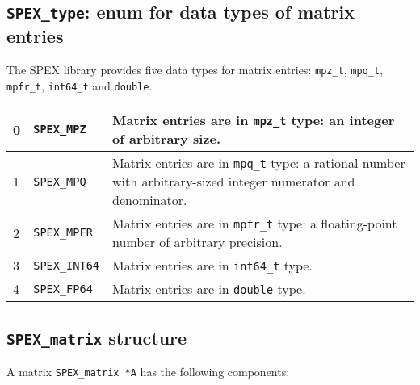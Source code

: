 \documentclass[12pt]{report}
\theoremstyle{definition}
\begin{document}
\cprotect\subsection{\verb|SPEX_type|: enum for data types of matrix entries}
\label{ss:SPEX_type}

The SPEX library provides five data types for matrix entries: \verb|mpz_t|,
\verb|mpq_t|, \verb|mpfr_t|, \verb|int64_t| and \verb|double|.

{\small
\begin{center}
\begin{tabular}{llp{4in}}
\hline
0 & \verb|SPEX_MPZ|     & Matrix entries are in \verb|mpz_t| type: an integer
                          of arbitrary size. \\
\hline
1 & \verb|SPEX_MPQ|     & Matrix entries are in \verb|mpq_t| type: a rational
                          number with arbitrary-sized integer numerator and
                          denominator. \\
\hline
2 & \verb|SPEX_MPFR|    & Matrix entries are in \verb|mpfr_t| type: a
                          floating-point number of arbitrary precision. \\
\hline
3 & \verb|SPEX_INT64|   & Matrix entries are in \verb|int64_t| type. \\
\hline
4 & \verb|SPEX_FP64|    & Matrix entries are in \verb|double| type. \\
\hline
\end{tabular}
\label{tab:SPEX_type}
\end{center}
}

\cprotect\subsection{\verb|SPEX_matrix| structure}

A matrix \verb|SPEX_matrix *A| has the following components:
\end{document}

